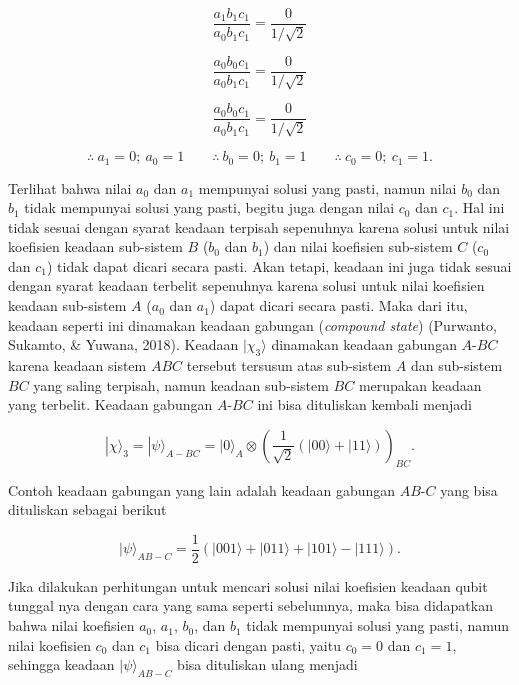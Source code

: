 \begin{equation}
\frac{a_1 b_1 c_1}{a_0 b_1 c_1}
=
\frac{0}{1/\sqrt{2}}
\end{equation}

\begin{equation}
\frac{a_0 b_0 c_1}{a_0 b_1 c_1}
=
\frac{0}{1/\sqrt{2}}
\end{equation}

\begin{equation}
\frac{a_0 b_0 c_1}{a_0 b_1 c_1}
=
\frac{0}{1/\sqrt{2}}
\end{equation}

\[
\therefore \ a_1 = 0 ; \ a_0 = 1
\qquad
\therefore \ b_0 = 0 ; \ b_1 = 1
\qquad
\therefore \ c_0 = 0 ; \ c_1 = 1 .
\]

Terlihat bahwa nilai $a_0$ dan $a_1$ mempunyai solusi yang pasti, namun nilai $b_0$ dan $b_1$ tidak mempunyai solusi yang pasti, begitu juga dengan nilai $c_0$ dan $c_1$. Hal ini tidak sesuai dengan syarat keadaan terpisah sepenuhnya karena solusi untuk nilai koefisien keadaan sub-sistem $B$ ($b_0$ dan $b_1$) dan nilai koefisien sub-sistem $C$ ($c_0$ dan $c_1$) tidak dapat dicari secara pasti. Akan tetapi, keadaan ini juga tidak sesuai dengan syarat keadaan terbelit sepenuhnya karena solusi untuk nilai koefisien keadaan sub-sistem $A$ ($a_0$ dan $a_1$) dapat dicari secara pasti. Maka dari itu, keadaan seperti ini dinamakan
keadaan gabungan (\textit{compound state}) (Purwanto, Sukamto, \& Yuwana, 2018).
Keadaan $|\chi_3\rangle$ dinamakan keadaan gabungan $A$-$BC$
karena keadaan sistem $ABC$ tersebut tersusun atas sub-sistem $A$ dan sub-sistem $BC$ yang saling terpisah, namun keadaan sub-sistem $BC$ merupakan keadaan yang terbelit. Keadaan gabungan $A$-$BC$ ini bisa dituliskan kembali menjadi

\begin{equation}
|\chi\rangle_3
=
|\psi\rangle_{A-BC}
=
|0\rangle_A \otimes
\left(
\frac{1}{\sqrt{2}}
(|00\rangle + |11\rangle)
\right)_{BC} .
\end{equation}

Contoh keadaan gabungan yang lain adalah keadaan gabungan $AB$-$C$ yang bisa dituliskan sebagai berikut

\begin{equation}
|\psi\rangle_{AB-C}
=
\frac{1}{2}
\left(
|001\rangle + |011\rangle + |101\rangle - |111\rangle
\right) .
\end{equation}

Jika dilakukan perhitungan untuk mencari solusi nilai koefisien keadaan qubit tunggal nya dengan cara yang sama seperti sebelumnya, maka bisa didapatkan bahwa nilai koefisien
$a_0$, $a_1$, $b_0$, dan $b_1$ tidak mempunyai solusi yang pasti, namun nilai koefisien $c_0$ dan $c_1$ bisa dicari dengan pasti, yaitu $c_0 = 0$ dan $c_1 = 1$, sehingga keadaan $|\psi\rangle_{AB-C}$ bisa dituliskan ulang menjadi

